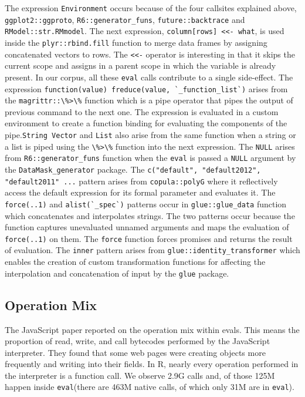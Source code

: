\documentclass[USenglish,cleveref, autoref, thm-restate]{lipics-v2019}
\newcommand{\eval}{\texttt{eval}\xspace}
\newcommand{\evals}{{\sf eval}s\xspace}
\renewcommand{\c}[1]{\lstinline{#1}\xspace}
\begin{document}
The expression \c{Environment} occurs because of the four callsites
explained above, \c{ggplot2::ggproto}, \c{R6::generator_funs},
\c{future::backtrace} and \c{RModel::str.RMmodel}. The next expression,
\c{column[rows] <<- what}, is used inside the \c{plyr::rbind.fill} function
to merge data frames by assigning concatenated vectors to rows. The \c{<<-}
operator is interesting in that it skips the current scope and assigns in a
parent scope in which the variable is already present. In our corpus, all
these \eval calls contribute to a single side-effect. The expression
\c{function(value) freduce(value, `_function_list`)} arises from the
\c{magrittr::\%>\%} function which is a pipe operator that pipes the output
of previous command to the next one. The expression is evaluated in a custom
environment to create a function binding for evaluating the components of
the pipe.\c{String Vector} and \c{List} also arise from the same function
when a string or a list is piped using the \c{\%>\%} function into the next
expression.  The \c{NULL} arises from \c{R6::generator_funs} function when
the \eval is passed a \c{NULL} argument by the \c{DataMask_generator}
package. The \c{c("default", "default2012", "default2011" ...} pattern
arises from \c{copula::polyG} where it reflectively access the default
expression for its formal parameter and evaluates it. The \c{force(..1)} and
\c{alist(`_spec`)} patterns occur in \c{glue::glue_data} function which
concatenates and interpolates strings. The two patterns occur because the
function captures unevaluated unnamed arguments and maps the evaluation of
\c{force(..1)} on them.  The \c{force} function forces promises and returns
the result of evaluation. The \c{inner} pattern arises from
\c{glue::identity_transformer} which enables the creation of custom
transformation functions for affecting the interpolation and concatenation
of input by the \c{glue} package.


\subsection{Operation Mix}

The JavaScript paper reported on the operation mix within \evals. This means
the proportion of read, write, and call bytecodes performed by the
JavaScript interpreter. They found that some web pages were creating objects
more frequently and writing into their fields.  In R, nearly every operation
performed in the interpreter is a function call. We observe 2.9G calls and,
of those 125M happen inside \eval (there are 463M native calls, of which
only 31M are in \eval).
\end{document}
